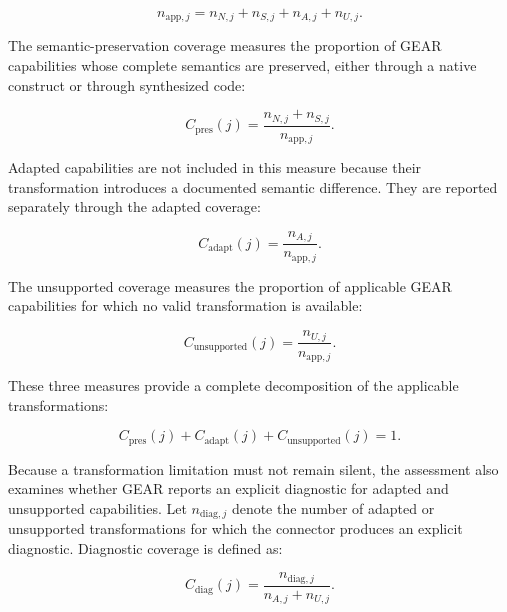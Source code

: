 \begin{equation}
    n_{\mathrm{app},j}
    =
    n_{N,j}
    +
    n_{S,j}
    +
    n_{A,j}
    +
    n_{U,j}.
    \label{eq:applicable-transformations}
\end{equation}

The semantic-preservation coverage measures the proportion of GEAR
capabilities whose complete semantics are preserved, either through a native
construct or through synthesized code:

\begin{equation}
    C_{\mathrm{pres}}(j)
    =
    \frac{n_{N,j}+n_{S,j}}
         {n_{\mathrm{app},j}}.
    \label{eq:preservation-coverage}
\end{equation}

Adapted capabilities are not included in this measure because their
transformation introduces a documented semantic difference. They are
reported separately through the adapted coverage:

\begin{equation}
    C_{\mathrm{adapt}}(j)
    =
    \frac{n_{A,j}}
         {n_{\mathrm{app},j}}.
    \label{eq:adapted-coverage}
\end{equation}

The unsupported coverage measures the proportion of applicable GEAR
capabilities for which no valid transformation is available:

\begin{equation}
    C_{\mathrm{unsupported}}(j)
    =
    \frac{n_{U,j}}
         {n_{\mathrm{app},j}}.
    \label{eq:unsupported-coverage}
\end{equation}

These three measures provide a complete decomposition of the applicable
transformations:

\begin{equation}
    C_{\mathrm{pres}}(j)
    +
    C_{\mathrm{adapt}}(j)
    +
    C_{\mathrm{unsupported}}(j)
    =
    1.
    \label{eq:transformation-decomposition}
\end{equation}

Because a transformation limitation must not remain silent, the assessment
also examines whether GEAR reports an explicit diagnostic for adapted and
unsupported capabilities. Let \(n_{\mathrm{diag},j}\) denote the number of
adapted or unsupported transformations for which the connector produces an
explicit diagnostic. Diagnostic coverage is defined as:

\begin{equation}
    C_{\mathrm{diag}}(j)
    =
    \frac{n_{\mathrm{diag},j}}
         {n_{A,j}+n_{U,j}}.
    \label{eq:diagnostic-coverage}
\end{equation}


